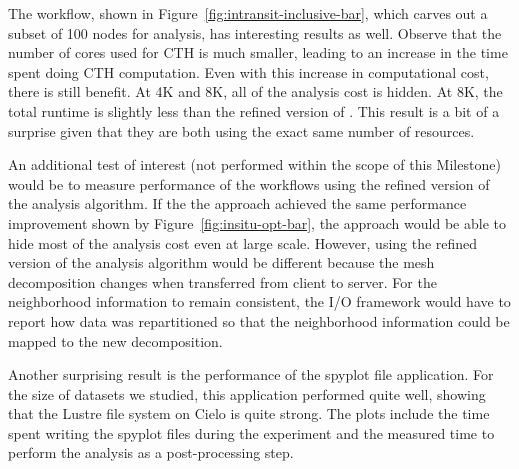 The \intransit workflow, shown in Figure~\ref{fig:intransit-inclusive-bar},
which carves out a subset of 100 nodes for analysis, has interesting
results as well.  Observe that the number of cores used for CTH is much
smaller, leading to an increase in the time spent doing CTH computation.
Even with this increase in computational cost, there is still benefit.  At
4K and 8K, all of the analysis cost is hidden.  At 8K, the total runtime is
slightly less than the refined version of \insitu.  This result is a bit
of a surprise given that they are both using the exact same number of
resources.


An additional test of interest (not performed within the scope of this Milestone) would be to measure
performance of the \intransit workflows using the refined version of
the analysis algorithm.  If the the \intransit approach achieved the same
performance improvement shown by Figure~\ref{fig:insitu-opt-bar}, the
\intransit approach would be able to hide most of the analysis cost even at
large scale.  However, using the refined version of the analysis algorithm
would be different because the mesh decomposition changes when transferred
from client to server.  For the neighborhood information to remain
consistent, the I/O framework would have to report how data was
repartitioned so that the neighborhood information could be mapped to the
new decomposition.

Another surprising result is the performance of the spyplot file application.
For the size of datasets we studied, this application performed quite well, showing that
the Lustre file system on Cielo is quite strong.  The plots include the time
spent writing the spyplot files during the experiment and the measured time to
perform the analysis as a post-processing step.



\FloatBarrier

